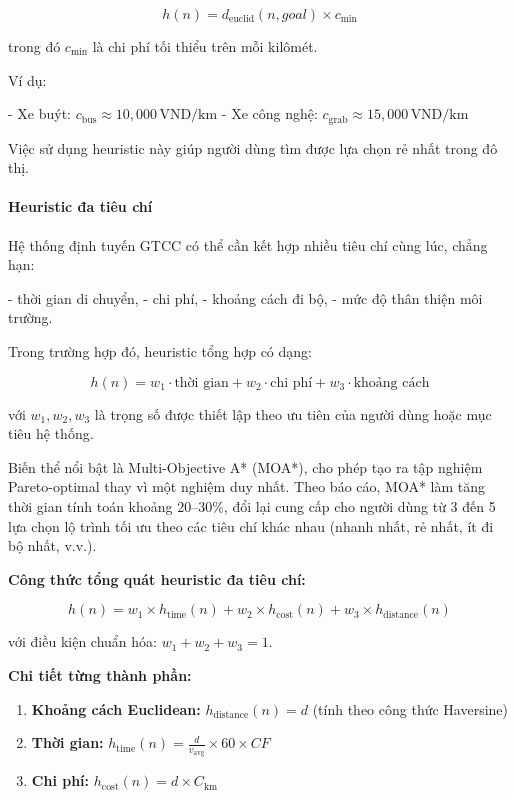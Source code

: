 \[
h(n) = d_{\text{euclid}}(n, goal) \times c_{\text{min}}
\]

trong đó $c_{\text{min}}$ là chi phí tối thiểu trên mỗi kilômét.

Ví dụ:

- Xe buýt: \( c_{\text{bus}} \approx 10{,}000\,\text{VND/km} \)
- Xe công nghệ: \( c_{\text{grab}} \approx 15{,}000\,\text{VND/km} \)

Việc sử dụng heuristic này giúp người dùng tìm được lựa chọn rẻ nhất trong đô thị.

\paragraph{Heuristic đa tiêu chí}

Hệ thống định tuyến GTCC có thể cần kết hợp nhiều tiêu chí cùng lúc, chẳng hạn:

- thời gian di chuyển,
- chi phí,
- khoảng cách đi bộ,
- mức độ thân thiện môi trường.

Trong trường hợp đó, heuristic tổng hợp có dạng:

\[
h(n) = w_1 \cdot \text{thời gian} + w_2 \cdot \text{chi phí} + w_3 \cdot \text{khoảng cách}
\]

với $w_1, w_2, w_3$ là trọng số được thiết lập theo ưu tiên của người dùng hoặc mục tiêu hệ thống.

Biến thể nổi bật là Multi-Objective A* (MOA*), cho phép tạo ra tập nghiệm Pareto-optimal thay vì một nghiệm duy nhất. Theo báo cáo, MOA* làm tăng thời gian tính toán khoảng 20--30\%, đổi lại cung cấp cho người dùng từ 3 đến 5 lựa chọn lộ trình tối ưu theo các tiêu chí khác nhau (nhanh nhất, rẻ nhất, ít đi bộ nhất, v.v.).

\textbf{Công thức tổng quát heuristic đa tiêu chí:}

\[
h(n) = w_1 \times h_{\text{time}}(n) + w_2 \times h_{\text{cost}}(n) + w_3 \times h_{\text{distance}}(n)
\]

với điều kiện chuẩn hóa: $w_1 + w_2 + w_3 = 1$.

\textbf{Chi tiết từng thành phần:}

\begin{enumerate}
    \item \textbf{Khoảng cách Euclidean:} $h_{\text{distance}}(n) = d$ (tính theo công thức Haversine)
    \item \textbf{Thời gian:} $h_{\text{time}}(n) = \frac{d}{v_{\text{avg}}} \times 60 \times CF$
    \item \textbf{Chi phí:} $h_{\text{cost}}(n) = d \times C_{\text{km}}$
\end{enumerate}

